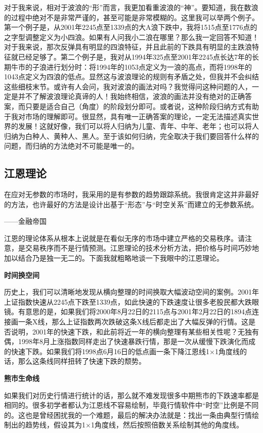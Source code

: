 对于我来说，相对于波浪的“形”而言，我更加看重波浪的“神”。要知道，我在数浪的过程中绝对不是非常严谨的，甚至可能是非常模糊的。这里我可以举两个例子。第一个例子是，从2001年2245点至1339点的大A浪下跌中，我将1515点至1776点的之字型调整定义为小四浪。如果有人问我小二浪在哪里？那么我一定回答不知道！对于我来说，那次反弹具有明显的四浪特征，并且此前的下跌具有明显的主跌浪特征就已经足够了。第二个例子是，我对从1994年325点至2001年2245点长达7年的长期牛市的子浪进行划分时：将1994年的1053点定义为一浪的高点，而将1998年的1043点定义为四浪的低点。显然这与波浪理论的规则有矛盾之处，但我并不会纠结这些细枝末节。或许有人会问，我对波浪的画法对吗？我觉得问这种问题的人，一定是并不了解波浪理论真谛的人！我始终相信，波浪的画法并没有绝对的正确答案，而只要是适合自己（角度）的阶段划分即可。或者说，这种阶段归纳方式有助于我对市场的理解即可。很显然，具有唯一正确答案的理论，一定无法描述真实世界的发展！这就好像，我们可以将人归纳为儿童、青年、中年、老年；也可以将人归纳为白种人、黄种人、黑人。至于该如何归纳，完全取决于我们要回答什么样的问题，而归纳的方法绝对不可能是唯一的。

\subsection{江恩理论}

{\kaishu
在应对无参数的市场时，我采用的是有参数的趋势跟踪系统。我很肯定这并非最好的方法，也许最好的方法是设计出基于“形态”与“时空关系”而建立的无参数系统。

\hfill ——金融帝国
}

江恩的理论体系从根本上说就是在看似无序的市场中建立严格的交易秩序。请注意，是交易秩序而不是行情预测。江恩理论的技术分析方法，把价格与时间巧妙地加以结合乃是独一无二的。下面我就粗略地谈一下我眼中的江恩理论。

\textbf{时间换空间}

历史上，我们可以清晰地发现从横向整理的时间换取大幅波动空间的案例。2001年上证指数快速从2245点下跌至1339点，如此快速的下跌速度让很多老股民都大跌眼镜。有意思的是，如果我们将2000年8月22日的2115点与2001年2月22日的1894点连接画一条X线，那么上证指数两次跌破这条X线后都走出了大幅反弹的行情。这是否说明，2001年的快速下跌，和此前将近一年的横向整理有某些相关性呢？无独有偶，1998年8月上涨指数同样走出了快速暴跌行情，那是一次从缓慢下跌演化而成的快速下跌。如果我们将1998点6月16日的低点画一条下降江恩线1×1角度线的话，那么这条线同样扭转了快速下跌的颓势。

\textbf{熊市生命线}

如果我们对历史行情进行统计的话，那么就不难发现很多中期熊市的下跌速率都是相同的。很多初学者都认为江恩线不容易绘制，毕竟行情软件中“时空”比例是不同的。这也是曾经困扰我的一个难题，最后的解决办法就是：找出一条由典型行情绘制出的趋势线，假设其为1×1角度线，然后按照倍数关系绘制其他的角度线。

